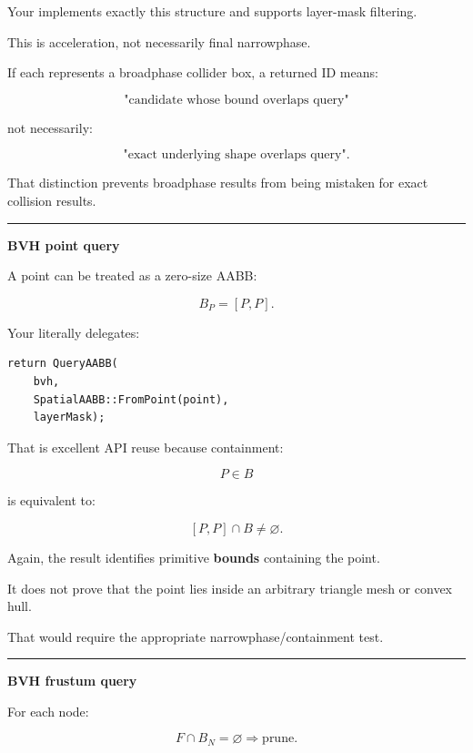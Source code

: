 Your  implements exactly this structure and supports layer-mask filtering.

This is acceleration, not necessarily final narrowphase.

If each  represents a broadphase collider box, a returned ID means:

\[
\text{"candidate whose bound overlaps query"}
\]

not necessarily:

\[
\text{"exact underlying shape overlaps query"}.
\]

That distinction prevents broadphase results from being mistaken for exact collision results.

\begin{center}\rule{0.5\linewidth}{0.5pt}\end{center}

\textbf{BVH point query}

A point can be treated as a zero-size AABB:

\[
B_P=[P,P].
\]

Your  literally delegates:

\begin{verbatim}
return QueryAABB(
    bvh,
    SpatialAABB::FromPoint(point),
    layerMask);
\end{verbatim}

That is excellent API reuse because containment:

\[
P\in B
\]

is equivalent to:

\[
[P,P]\cap B\ne\varnothing.
\]

Again, the result identifies primitive \textbf{bounds} containing the point.

It does not prove that the point lies inside an arbitrary triangle mesh or convex hull.

That would require the appropriate narrowphase/containment test.

\begin{center}\rule{0.5\linewidth}{0.5pt}\end{center}

\textbf{BVH frustum query}

For each node:

\[
F\cap B_N=\varnothing
\Rightarrow
\text{prune}.
\]

